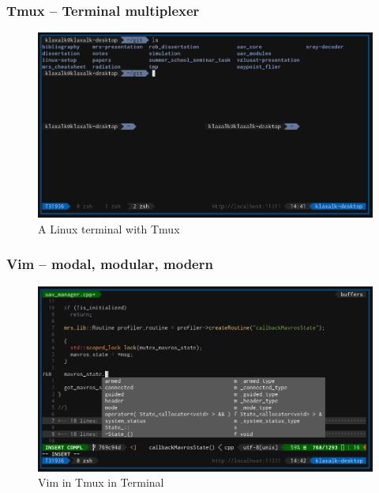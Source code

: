 \documentclass{beamer}
\begin{document}
\begin{frame}

  \frametitle{Tmux -- Terminal multiplexer}

  \begin{figure}
    \caption{A Linux terminal with Tmux}
    \includegraphics[width=1.0\textwidth]{./fig/tmux.png}
  \end{figure}

\end{frame}

\begin{frame}
  \frametitle{Vim -- modal, modular, modern}

  \begin{figure}
    \caption{Vim in Tmux in Terminal}
    \includegraphics[width=1.0\textwidth]{./fig/vim.png}
  \end{figure}

\end{frame}
\end{document}
